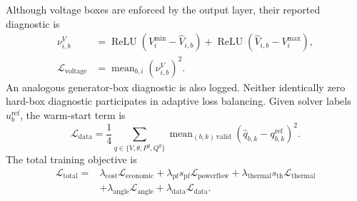 \documentclass[final,5p,times,twocolumn]{elsarticle}
\newcommand{\relu}{\operatorname{ReLU}}
\newcommand{\mean}{\operatorname{mean}}
\begin{document}
Although voltage boxes are
enforced by the output layer, their reported diagnostic is
\begin{align}
  \nu_{i,b}^{V}
  &=
  \relu(V_i^{\min}-\widehat V_{i,b})
  +\relu(\widehat V_{i,b}-V_i^{\max}),
  \nonumber\\
  \mathcal{L}_{\mathrm{voltage}}
  &=
  \mean_{b,i}(\nu_{i,b}^{V})^2.
  \label{eq:loss_voltage}
\end{align}
An analogous generator-box diagnostic is also logged. Neither identically zero
hard-box diagnostic participates in adaptive loss balancing. Given solver
labels $u_b^{\mathrm{ref}}$, the warm-start term is
\begin{equation}
  \mathcal{L}_{\mathrm{data}}
  =
  \frac{1}{4}\sum_{q\in\{V,\theta,P^g,Q^g\}}
  \mean_{(b,k)\,\mathrm{valid}}
  (\widehat q_{b,k}-q_{b,k}^{\mathrm{ref}})^2.
  \label{eq:loss_data}
\end{equation}
The total training objective is
\begin{equation}
  \begin{aligned}
    \mathcal{L}_{\mathrm{total}}
    ={}&
    \lambda_{\mathrm{cost}}\mathcal{L}_{\mathrm{economic}}
    +\lambda_{\mathrm{pf}}s_{\mathrm{pf}}\mathcal{L}_{\mathrm{powerflow}}
    +\lambda_{\mathrm{thermal}}s_{\mathrm{th}}\mathcal{L}_{\mathrm{thermal}}\\
    &+\lambda_{\mathrm{angle}}\mathcal{L}_{\mathrm{angle}}
    +\lambda_{\mathrm{data}}\mathcal{L}_{\mathrm{data}}.
  \end{aligned}
  \label{eq:total_loss}
\end{equation}
\end{document}
